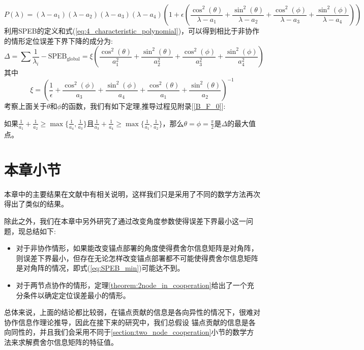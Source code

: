 \begin{equation}\label{eq:4_characteristic_polynomial}
P(\lambda)= (\lambda-a_1)(\lambda-a_2)(\lambda-a_3)(\lambda-a_4)(1+\epsilon(\frac{\cos^2(\theta)}{\lambda-a_1}+
 \frac{\sin^2(\theta)}{\lambda-a_2}+\frac{\cos^2(\phi)}{\lambda-a_3}+\frac{\sin^2(\phi)}{\lambda-a_4}))
\end{equation}
利用SPEB的定义和式(\ref{eq:4_characteristic_polynomial})，可以得到相比于非协作的情形定位误差下界下降的成分为:
\begin{equation}
\Delta=\sum \frac{1}{\lambda_i}-\text{SPEB}_{\text{global}}=\xi\left(\frac{\cos^2(\theta)}{a_1^2}+\frac{\sin^2(\theta)}{a_2^2}+\frac{\cos^2(\phi)}{a_3^2}+\frac{\sin^2(\phi)}{a_4^2}\right)
\end{equation}
其中
\begin{equation}
\xi=\left(\frac{1}{\epsilon}+\frac{\cos^2(\phi)}{a_3}+\frac{\sin^2(\phi)}{a_4}+\frac{\cos^2(\theta)}{a_1}+\frac{\sin^2(\theta)}{a_2}\right)^{-1}
\end{equation}
考察上面关于$\theta$和$\phi$的函数，我们有如下定理,推导过程见附录[\ref{B_F_0}]:
\begin{theorem}\label{theorem:2node_in_cooperation}
如果$\frac{1}{a_1}+\frac{1}{a_2}\geq \max\{\frac{1}{a_4},\frac{1}{a_3}\}$且$\frac{1}{a_3}+\frac{1}{a_4}\geq\max\{\frac{1}{a_1},\frac{1}{a_2}\}$，那么$\theta=\phi=\frac{\pi}{2}$是$\Delta$的最大值点。
\end{theorem}
\section{本章小节}\label{section:conclusion3}
  本章中的主要结果在文献\cite{LimitBound2}中有相关说明，这样我们只是采用了不同的数学方法再次得出了类似的结果。

  除此之外，我们在本章中另外研究了通过改变角度参数使得误差下界最小这一问题，现总结如下:
  \begin{itemize}
  \item 对于非协作情形，如果能改变锚点部署的角度使得费舍尔信息矩阵是对角阵，则误差下界最小，但存在无论怎样改变锚点部署都不可能使得费舍尔信息矩阵是对角阵的情况，即式(\ref{eq:SPEB_min})可能达不到。
  \item 对于两节点协作的情形，定理\ref{theorem:2node_in_cooperation}给出了一个充分条件以确定定位误差最小的情形。
  \end{itemize}
  总体来说，上面的结论都比较弱，在锚点贡献的信息是各向异性的情况下，很难对协作信息作理论推导，因此在接下来的研究中，我们总假设
  锚点贡献的信息是各向同性的，并且我们会采用不同于\ref{section:two_node_cooperation}小节的数学方法来求解费舍尔信息矩阵的特征值。
